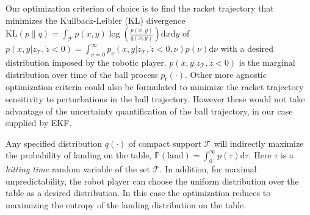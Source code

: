 \documentclass[letterpaper, 10 pt, conference]{ieeeconf}
\newcommand{\court}{\mathcal{T}} %
\newcommand{\prob}{\mathbb{P}} %
\newcommand{\landTime}{\tau} %
\newcommand{\landDist}{p(\tau)} %
\newcommand{\hitTime}{\nu} %
\newcommand{\hitDist}{p(\nu)} %
\begin{document}
Our optimization criterion of choice is to find the racket trajectory that minimizes the Kullback-Leibler (KL) divergence $\textrm{KL}(p\|q) = \int_{\court}p(x,y)\log(\frac{p(x,y)}{q(x,y)})\textrm{d}x\textrm{d}y$ of $p(x,y|z_{\court},\dot{z} < 0) = \int_{\hitTime = 0}^{\infty} p_{\hitTime}(x,y|z_{\court},\dot{z} < 0,\hitTime)\hitDist \textrm{d}\hitTime$ with a desired distribution imposed by the robotic player. $p(x,y|z_{\court},\dot{z} < 0)$ is the marginal distribution over time of the ball process $p_t(\cdot)$. Other more agnostic optimization criteria could also be formulated to minimize the racket trajectory sensitivity to perturbations in the ball trajectory. However these would not take advantage of the uncertainty quantification of the ball trajectory, in our case supplied by EKF.

Any specified distribution $q(\cdot)$ of compact support $\court$ will indirectly maximize the probability of landing on the table, $\prob(\textrm{land}) = \int_{0}^{\infty}\landDist\textrm{d}\landTime$. Here $\landTime$ is a \emph{hitting time} random variable of the set $\court$. In addition, for maximal unpredictability, the robot player can choose the uniform distribution over the table as a desired distribution. In this case the optimization reduces to maximizing the entropy of the landing distribution on the table. 
\end{document}
